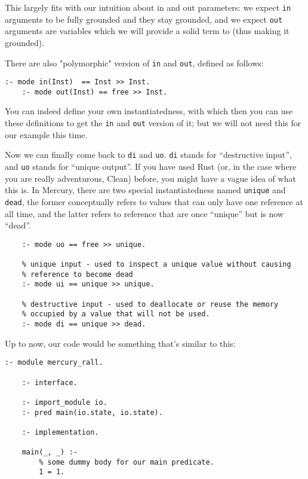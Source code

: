 This largely fits with our intuition about in and out parameters: we expect \texttt{in} arguments to be fully grounded and they stay grounded, and we expect \texttt{out} arguments are variables which we will provide a solid term to (thus making it grounded).

There are also "polymorphic" version of \texttt{in} and \texttt{out}, defined as follows:

\begin{lstlisting}[language=Mercury]
	:- mode in(Inst)  == Inst >> Inst.
	:- mode out(Inst) == free >> Inst.
\end{lstlisting}

You can indeed define your own instantiatedness, with which then you can use these definitions to get the \texttt{in} and \texttt{out} version of it; but we will not need this for our example this time.

Now we can finally come back to \texttt{di} and \texttt{uo}. \texttt{di} stands for ``destructive input'', and \texttt{uo} stands for ``unique output''. If you have used Rust (or, in the case where you are really adventurous, Clean) before, you might have a vague idea of what this is. In Mercury, there are two special instantiatedness named \texttt{unique} and \texttt{dead}, the former conceptually refers to values that can only have one reference at all time, and the latter refers to reference that are once ``unique'' but is now ``dead''.

\begin{lstlisting}[language=Mercury]
	% unique output - used to create a "unique" value
	:- mode uo == free >> unique.
	
	% unique input - used to inspect a unique value without causing
	% reference to become dead
	:- mode ui == unique >> unique.
	
	% destructive input - used to deallocate or reuse the memory
	% occupied by a value that will not be used.
	:- mode di == unique >> dead.
\end{lstlisting}

Up to now, our code would be something that's similar to this:

\begin{lstlisting}[language=Mercury]
	:- module mercury_rall.
	
	:- interface.
	
	:- import_module io.
	:- pred main(io.state, io.state).
	
	:- implementation.
	
	main(_, _) :-
	    % some dummy body for our main predicate.
	    1 = 1.
\end{lstlisting}


